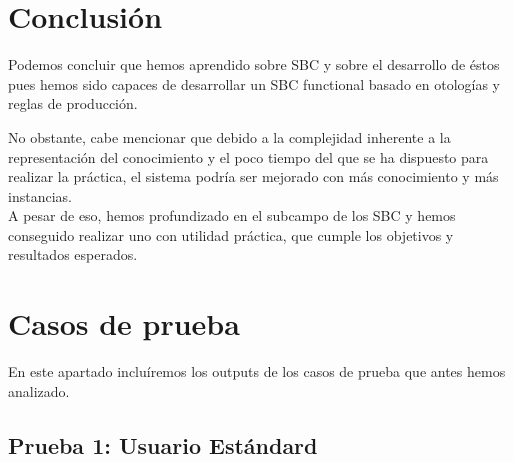 \documentclass[11]{article}
\begin{document}
\section{Conclusión}
Podemos concluir que hemos aprendido sobre SBC y sobre el desarrollo de éstos pues hemos sido capaces de desarrollar un SBC functional basado en otologías y reglas de producción.

No obstante, cabe mencionar que debido a la complejidad inherente a la representación del conocimiento y el poco tiempo del que se ha dispuesto para realizar la práctica, el sistema podría ser mejorado con más conocimiento y más instancias. 
\\

A pesar de eso, hemos profundizado en el subcampo de los SBC y hemos conseguido realizar uno con utilidad práctica, que cumple los objetivos y resultados esperados.

\newpage
\appendix
\appendixpage
\addappheadtotoc
\section{Casos de prueba}
En este apartado incluíremos los outputs de los casos de prueba que antes hemos analizado.

\subsection{Prueba 1: Usuario Estándard}
\end{document}
